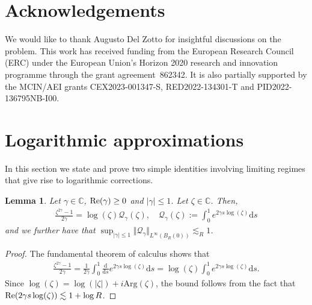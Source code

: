 \documentclass[11pt,reqno]{amsproc}
\newtheorem{lemma}[proposition]{Lemma}
\theoremstyle{definition}
\numberwithin{equation}{section}
\newcommand{\C}{{\mathbb C}}
\newcommand{\Q}{{\mathcal{Q}}}
\renewcommand{\d}{\mathrm{d}}
\def\Re{{\rm Re}}
\begin{document}
\section*{Acknowledgements}

We would like to thank Augusto Del Zotto for insightful discussions on the problem. This work has received funding from the European Research Council (ERC) under the European Union's Horizon 2020 research and innovation programme through the grant agreement~862342. It is also partially supported by the MCIN/AEI grants CEX2023-001347-S, RED2022-134301-T and PID2022-136795NB-I00.















\appendix



\section{Logarithmic approximations}
In this section we state and prove two simple identities involving limiting regimes that give rise to logarithmic corrections.

\begin{lemma}\label{lemma:firstgammalog}
Let $\gamma\in \C$, $\Re(\gamma)\geq 0$ and $|\gamma|\leq 1$. Let $\zeta\in \C$. Then,
\begin{align*}
\frac{\zeta^{2\gamma} - 1}{2\gamma} = \log(\zeta) \Q_{\gamma}(\zeta), \quad \Q_{\gamma}(\zeta) := \int_0^1 e^{2\gamma s \log(\zeta)} \d s
\end{align*}
and we further have that $\sup_{|\gamma|\leq 1} \Vert \Q_{\gamma} \Vert_{L^\infty(B_R(0))}\lesssim_R 1$.
\end{lemma}

\begin{proof}
The fundamental theorem of calculus shows that
\begin{align*}
\frac{\zeta^{2\gamma} - 1}{2\gamma} = \frac{1}{2\gamma}\int_0^1 \frac{\d}{\d s}e^{2\gamma s \log(\zeta)} \d s= \log(\zeta) \int_0^1 e^{2\gamma s \log(\zeta)} \d s.
\end{align*}
Since $\log(\zeta) = \log(|\zeta|) + i \text{Arg}(\zeta)$, the  bound follows from the fact that $\Re(2\gamma s \log(\zeta))\lesssim 1 + \log R$. 
\end{proof}
\end{document}
